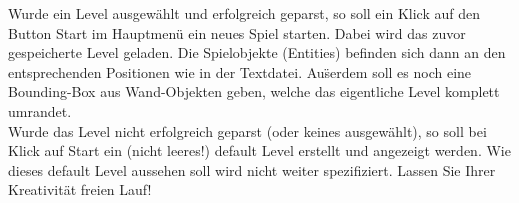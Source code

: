 Wurde ein Level ausgew\"ahlt und erfolgreich geparst, so soll ein Klick auf den Button \glqq Start\grqq{} im Hauptmen\"u ein neues Spiel starten. Dabei wird das zuvor gespeicherte Level geladen. Die Spielobjekte (Entities) befinden sich dann an den entsprechenden Positionen wie in der Textdatei.
Au\"serdem soll es noch eine Bounding-Box aus Wand-Objekten geben, welche das eigentliche Level komplett umrandet.\\
Wurde das Level nicht erfolgreich geparst (oder keines ausgew\"ahlt), so soll bei Klick auf \glqq Start\grqq{} ein (nicht leeres!) default Level erstellt und angezeigt werden. Wie dieses default Level aussehen soll wird nicht weiter spezifiziert. Lassen Sie Ihrer Kreativit\"at freien Lauf!
